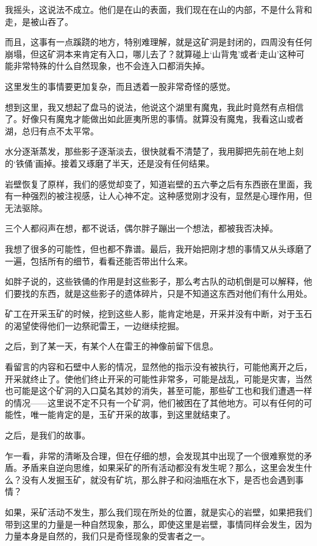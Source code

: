我摇头，这说法不成立。他们是在山的表面，我们现在在山的内部，不是什么背和走，是被山吞了。

而且，这事有一点蹊跷的地方，特别难理解，就是这矿洞是封闭的，四周没有任何崩塌，但这矿洞本来肯定有入口，哪儿去了？就算碰上‘山背鬼’或者‘走山’这种可能非常特殊的什么自然现象，也不会连入口都消失掉。

这里发生的事情要更加复杂，而且透着一股非常奇怪的感觉。

想到这里，我又想起了盘马的说法，他说这个湖里有魔鬼，我此时竟然有点相信了。好像只有魔鬼才能做出如此匪夷所思的事情。就算没有魔鬼，我看这山或者湖，总归有点不太平常。

水分逐渐蒸发，那些影子逐渐淡去，很快就看不清楚了，我用脚把先前在地上刻的‘铁俑’画掉。接着又琢磨了半天，还是没有任何结果。

岩壁恢复了原样，我们的感觉却变了，知道岩壁的五六拳之后有东西嵌在里面，我有一种强烈的被注视感，让人心神不定。这种感觉刚才没有，显然是心理作用，但无法驱除。

三个人都闷声在想，都不说话，偶尔胖子蹦出一个想法，都被我否决掉。

我想了很多的可能性，但也都不靠谱。最后，我开始把刚才想的事情又从头琢磨了一遍，包括所有的细节，看看还能否带出什么来。

如胖子说的，这些铁俑的作用是封这些影子，那么考古队的动机倒是可以解释，他们要找的东西，就是这些影子的遗体碎片，只是不知道这东西对他们有什么用处。

矿工在开采玉矿的时候，挖到这些人影，能肯定地是，开采并没有中断，对于玉石的渴望使得他们一边祭祀雷王，一边继续挖掘。

之后，到了某一天，有某个人在雷王的神像前留下信息。

看留言的内容和石壁中人影的情况，显然他的指示没有被执行，可能他离开之后，开采就终止了。使他们终止开采的可能性非常多，可能是战乱，可能是灾害，当然也可能是这个矿洞的入口莫名其妙的消失，甚至可能，那些矿工也和我们遭遇一样的情况——这里说不定不只有一个矿洞，他们被困在了其他地方。可以有任何的可能性，唯一能肯定的是，玉矿开采的故事，到这里就结束了。

之后，是我们的故事。

乍一看，非常的清晰及合理，但在仔细的想，会发现其中出现了一个很难察觉的矛盾。矛盾来自逆向思维，如果采矿的所有活动都没有发生呢？那么，这里会发生什么？没有人发掘玉矿，就没有矿坑，那么胖子和闷油瓶在水下，是否也会遇到事情？

如果，采矿活动不发生，那么我们现在所处的位置，就是实心的岩壁，如果把我们带到这里的力量是一种自然现象，那么，即使这里是岩壁，事情同样会发生，因为力量本身是自然的，我们只是奇怪现象的受害者之一。

